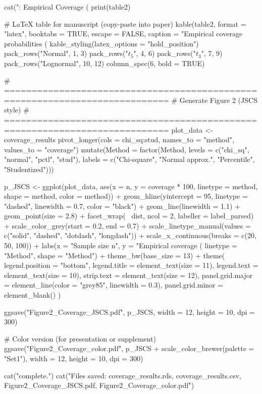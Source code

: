 cat(": Empirical Coverage (%
print(table2)

# LaTeX table for manuscript (copy-paste into paper)
kable(table2,
      format = "latex",
      booktabs = TRUE,
      escape = FALSE,
      caption = "Empirical coverage probabilities (%
      kable_styling(latex_options = "hold_position") %
  pack_rows("Normal", 1, 3) %
  pack_rows("$t_5$", 4, 6) %
  pack_rows("$t_3$", 7, 9) %
  pack_rows("Lognormal", 10, 12) %
  column_spec(6, bold = TRUE)

# ============================================================================
# Generate Figure 2 (JSCS style)
# ============================================================================
plot_data <- coverage_results %
    pivot_longer(cols = chi_sq:stud, names_to = "method", values_to = "coverage") %
    mutate(Method = factor(Method, 
                           levels = c("chi_sq", "normal", "pctl", "stud"),
                           labels = c("Chi-square", "Normal approx.", "Percentile", "Studentized")))


p_JSCS <- ggplot(plot_data,
                 aes(x = n,
                     y = coverage * 100,
                     linetype = method,
                     shape = method,
                     color = method)) +
  geom_hline(yintercept = 95,
             linetype = "dashed",
             linewidth = 0.7,
             color = "black") +
  geom_line(linewidth = 1.1) +
  geom_point(size = 2.8) +
  facet_wrap(~ dist, ncol = 2, labeller = label_parsed) +
  scale_color_grey(start = 0.2, end = 0.7) +
  scale_linetype_manual(values = c("solid", "dashed", "dotdash", "longdash")) +
  scale_x_continuous(breaks = c(20, 50, 100)) +
  labs(x = "Sample size n",
       y = "Empirical coverage (%
       linetype = "Method",
       shape = "Method") +
  theme_bw(base_size = 13) +
  theme(
    legend.position = "bottom",
    legend.title = element_text(size = 11),
    legend.text = element_text(size = 10),
    strip.text = element_text(size = 12),
    panel.grid.major = element_line(color = "grey85", linewidth = 0.3),
    panel.grid.minor = element_blank()
  )

ggsave("Figure2_Coverage_JSCS.pdf",
       p_JSCS,
       width = 12,
       height = 10,
       dpi = 300)

# Color version (for presentation or supplement)
ggsave("Figure2_Coverage_color.pdf",
       p_JSCS + scale_color_brewer(palette = "Set1"),
       width = 12,
       height = 10,
       dpi = 300)

cat("\nSimulation complete.\n")
cat("Files saved: coverage_results.rds, coverage_results.csv, Figure2_Coverage_JSCS.pdf, Figure2_Coverage_color.pdf\n")
